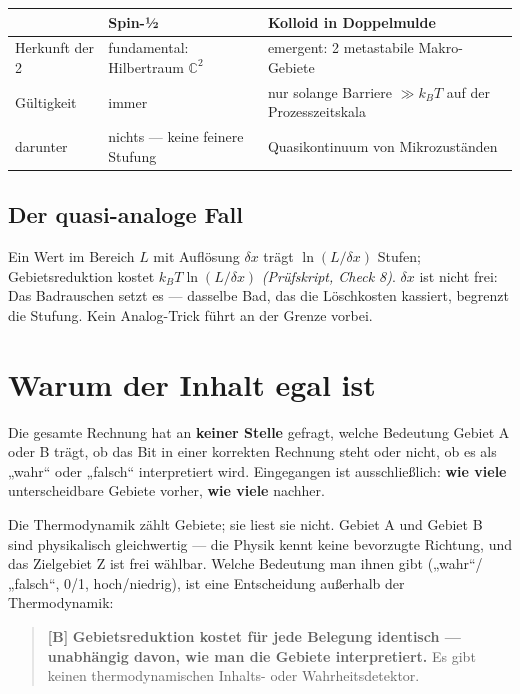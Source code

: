 \begin{center}
\small
\begin{tabular}{@{}p{}p{}p{}@{}}
\toprule
 & \textbf{Spin-½} & \textbf{Kolloid in Doppelmulde} \\
\midrule
Herkunft der 2 & fundamental: Hilbertraum $\mathbb{C}^2$ & emergent: 2 metastabile Makro-Gebiete \\
Gültigkeit & immer & nur solange Barriere $\gg k_B T$ auf der Prozesszeitskala \\
darunter & nichts --- keine feinere Stufung & Quasikontinuum von Mikrozuständen \\
\bottomrule
\end{tabular}
\end{center}

\subsection{Der quasi-analoge Fall}

Ein Wert im Bereich $L$ mit Auflösung $\delta x$ trägt $\ln(L/\delta x)$ Stufen;
Gebietsreduktion kostet $k_B T \ln(L/\delta x)$ \emph{(Prüfskript, Check 8)}. $\delta x$ ist
nicht frei: Das Badrauschen setzt es --- dasselbe Bad, das die Löschkosten
kassiert, begrenzt die Stufung. Kein Analog-Trick führt an der Grenze vorbei.

\section{Warum der Inhalt egal ist}
\label{sec:inhalt}

Die gesamte Rechnung hat an \textbf{keiner Stelle} gefragt, welche Bedeutung
Gebiet A oder B trägt, ob das Bit in einer korrekten Rechnung steht oder nicht, ob
es als „wahr“ oder „falsch“ interpretiert wird. Eingegangen ist ausschließlich:
\textbf{wie viele} unterscheidbare Gebiete vorher, \textbf{wie viele} nachher.

Die Thermodynamik zählt Gebiete; sie liest sie nicht. Gebiet A und Gebiet B sind
physikalisch gleichwertig --- die Physik kennt keine bevorzugte Richtung, und das
Zielgebiet Z ist frei wählbar. Welche Bedeutung man ihnen gibt („wahr“/„falsch“,
0/1, hoch/niedrig), ist eine Entscheidung außerhalb der Thermodynamik:

\begin{quote}
\textbf{[B]} \textbf{Gebietsreduktion kostet für jede Belegung identisch --- unabhängig
davon, wie man die Gebiete interpretiert.} Es gibt keinen thermodynamischen
Inhalts- oder Wahrheitsdetektor.
\end{quote}


